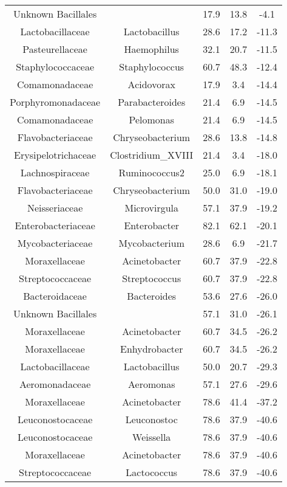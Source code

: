 \begin{table}
\begin{center}
\begin{tabular}{ccccc}
	Unknown Bacillales &  & 17.9 & 13.8 & -4.1 \\
	Lactobacillaceae & Lactobacillus & 28.6 & 17.2 & -11.3 \\
	Pasteurellaceae & Haemophilus & 32.1 & 20.7 & -11.5 \\
	Staphylococcaceae & Staphylococcus & 60.7 & 48.3 & -12.4 \\
	Comamonadaceae & Acidovorax & 17.9 & 3.4 & -14.4 \\
	Porphyromonadaceae & Parabacteroides & 21.4 & 6.9 & -14.5 \\
	Comamonadaceae & Pelomonas & 21.4 & 6.9 & -14.5 \\
	Flavobacteriaceae & Chryseobacterium & 28.6 & 13.8 & -14.8 \\
	Erysipelotrichaceae & Clostridium\_XVIII & 21.4 & 3.4 & -18.0 \\
	Lachnospiraceae & Ruminococcus2 & 25.0 & 6.9 & -18.1 \\
	Flavobacteriaceae & Chryseobacterium & 50.0 & 31.0 & -19.0 \\
	Neisseriaceae & Microvirgula & 57.1 & 37.9 & -19.2 \\
	Enterobacteriaceae & Enterobacter & 82.1 & 62.1 & -20.1 \\
	Mycobacteriaceae & Mycobacterium & 28.6 & 6.9 & -21.7 \\
	Moraxellaceae & Acinetobacter & 60.7 & 37.9 & -22.8 \\
	Streptococcaceae & Streptococcus & 60.7 & 37.9 & -22.8 \\
	Bacteroidaceae & Bacteroides & 53.6 & 27.6 & -26.0 \\
	Unknown Bacillales &  & 57.1 & 31.0 & -26.1 \\
	Moraxellaceae & Acinetobacter & 60.7 & 34.5 & -26.2 \\
	Moraxellaceae & Enhydrobacter & 60.7 & 34.5 & -26.2 \\
	Lactobacillaceae & Lactobacillus & 50.0 & 20.7 & -29.3 \\
	Aeromonadaceae & Aeromonas & 57.1 & 27.6 & -29.6 \\
	Moraxellaceae & Acinetobacter & 78.6 & 41.4 & -37.2 \\
	Leuconostocaceae & Leuconostoc & 78.6 & 37.9 & -40.6 \\
	Leuconostocaceae & Weissella & 78.6 & 37.9 & -40.6 \\
	Moraxellaceae & Acinetobacter & 78.6 & 37.9 & -40.6 \\
	Streptococcaceae & Lactococcus & 78.6 & 37.9 & -40.6 \\

\end{tabular}
\end{center}
\end{table}
